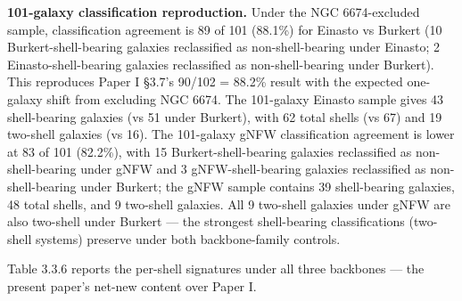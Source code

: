 \documentclass[linenumbers,trackchanges]{aastex701}
\begin{document}
\textbf{101-galaxy classification reproduction.} Under the NGC 6674-excluded sample, classification agreement is 89 of 101 (88.1\%) for Einasto vs Burkert (10 Burkert-shell-bearing galaxies reclassified as non-shell-bearing under Einasto; 2 Einasto-shell-bearing galaxies reclassified as non-shell-bearing under Burkert). This reproduces Paper I \S3.7's 90/102 = 88.2\% result with the expected one-galaxy shift from excluding NGC 6674. The 101-galaxy Einasto sample gives 43 shell-bearing galaxies (vs 51 under Burkert), with 62 total shells (vs 67) and 19 two-shell galaxies (vs 16). The 101-galaxy gNFW classification agreement is lower at 83 of 101 (82.2\%), with 15 Burkert-shell-bearing galaxies reclassified as non-shell-bearing under gNFW and 3 gNFW-shell-bearing galaxies reclassified as non-shell-bearing under Burkert; the gNFW sample contains 39 shell-bearing galaxies, 48 total shells, and 9 two-shell galaxies. All 9 two-shell galaxies under gNFW are also two-shell under Burkert --- the strongest shell-bearing classifications (two-shell systems) preserve under both backbone-family controls.

Table 3.3.6 reports the per-shell signatures under all three backbones --- the present paper's net-new content over Paper I.
\end{document}
